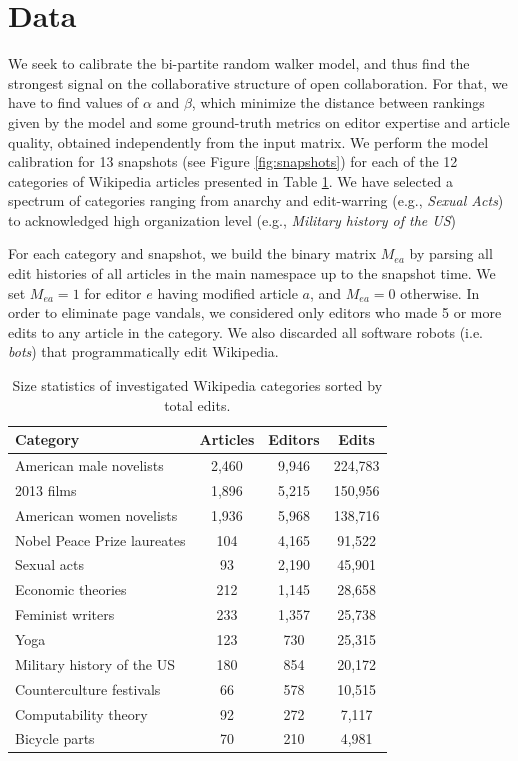 \section{Data}
We seek to calibrate the bi-partite random walker model, and thus find the strongest signal on the collaborative structure of open collaboration. For that, we have to find values of $\alpha$ and $\beta$, which minimize the distance between rankings given by the model and some ground-truth metrics on editor expertise and article quality, obtained independently from the input matrix. We perform the model calibration for 13 snapshots (see Figure \ref{fig:snapshots})  for each of  the 12 categories of Wikipedia articles presented in Table \nolinebreak \ref{tab:statistics}. We have selected a spectrum of categories ranging from anarchy and edit-warring (e.g., {\it Sexual Acts}) to acknowledged high organization level (e.g., {\it Military history of the US})


For each category and snapshot, we build the binary matrix $M_{ea}$ by parsing all edit histories of all articles in the main namespace up to the snapshot time. We set $M_{ea} = 1$ for editor $e$ having modified article $a$, and $M_{ea} = 0$ otherwise. In order to eliminate page vandals, we considered only editors who made 5 or more edits to any article in the category. We also discarded all software robots (i.e. {\it bots}) that programmatically edit Wikipedia. 

\begin{table}
\begin{tabular}{|l|c|c|c|}
\hline
{\bf Category} &  {\bf Articles} &  {\bf Editors} &  {\bf Edits} \\
\hline
American male novelists               &      2,460 &   9,946 &  224,783 \\
2013 films                            &      1,896 &   5,215 &  150,956 \\
American women novelists              &      1,936 &   5,968 &  138,716 \\
Nobel Peace Prize laureates           &       104 &   4,165 &   91,522 \\
Sexual acts                           &        93 &   2,190 &   45,901 \\
Economic theories                     &       212 &   1,145 &   28,658 \\
Feminist writers                      &       233 &   1,357 &   25,738 \\
Yoga                                  &       123 &    730 &   25,315 \\
Military history of the US &       180 &    854 &   20,172 \\
Counterculture festivals              &        66 &    578 &   10,515 \\
Computability theory                  &        92 &    272 &    7,117 \\
Bicycle parts                         &        70 &    210 &    4,981 \\
\hline
\end{tabular}
\caption{Size statistics of investigated Wikipedia categories sorted by total edits.}
\label{tab:statistics}
\end{table}

